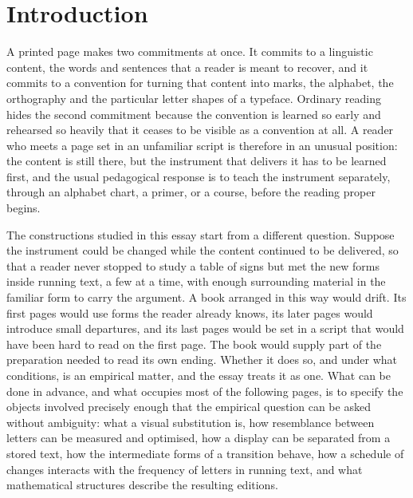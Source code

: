 \section{Introduction}\label{sec:intro}

A printed page makes two commitments at once. It commits to a linguistic content, the words and sentences that a reader is meant to recover, and it commits to a convention for turning that content into marks, the alphabet, the orthography and the particular letter shapes of a typeface. Ordinary reading hides the second commitment because the convention is learned so early and rehearsed so heavily that it ceases to be visible as a convention at all. A reader who meets a page set in an unfamiliar script is therefore in an unusual position: the content is still there, but the instrument that delivers it has to be learned first, and the usual pedagogical response is to teach the instrument separately, through an alphabet chart, a primer, or a course, before the reading proper begins.

The constructions studied in this essay start from a different question. Suppose the instrument could be changed while the content continued to be delivered, so that a reader never stopped to study a table of signs but met the new forms inside running text, a few at a time, with enough surrounding material in the familiar form to carry the argument. A book arranged in this way would drift. Its first pages would use forms the reader already knows, its later pages would introduce small departures, and its last pages would be set in a script that would have been hard to read on the first page. The book would supply part of the preparation needed to read its own ending. Whether it does so, and under what conditions, is an empirical matter, and the essay treats it as one. What can be done in advance, and what occupies most of the following pages, is to specify the objects involved precisely enough that the empirical question can be asked without ambiguity: what a visual substitution is, how resemblance between letters can be measured and optimised, how a display can be separated from a stored text, how the intermediate forms of a transition behave, how a schedule of changes interacts with the frequency of letters in running text, and what mathematical structures describe the resulting editions.

